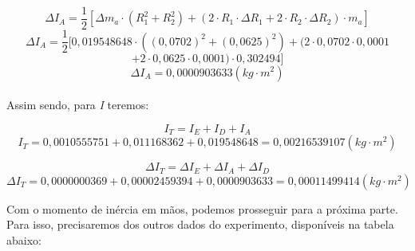 \[\Delta I_A = \frac{1}{2} 
    \left[ 
        \Delta m_a \cdot (R_1^2 + R_2^2) + 
        \left( 2 \cdot R_1 \cdot \Delta R_1 + 2 \cdot R_2 \cdot \Delta R_2 \right) \cdot m_a
    \right]
\]
\[\Delta I_A = \frac{1}{2} 
    [ 
        0,019548648 \cdot ((0,0702)^2 + (0,0625)^2) + 
        (2 \cdot 0,0702 \cdot 0,0001 
\]\[
        + 2 \cdot 0,0625 \cdot 0,0001) \cdot 0,302494
    ]
\]
\[\Delta I_A = 0,0000903633 (kg \cdot m^2)\]\\

Assim sendo, para \textit{I} teremos:

\[I_T = I_E + I_D + I_A\]
\[I_T = 0,0010555751 + 0,011168362 + 0,019548648 = 0,00216539107 (kg \cdot m^2)\]

\[\Delta I_T = \Delta I_E + \Delta I_A + \Delta I_D\]
\[\Delta I_T = 0,0000000369 + 0,00002459394 + 0,0000903633 = 0,00011499414 (kg \cdot m^2)\]

Com o momento de inércia em mãos, podemos prosseguir para a próxima parte. Para isso, precisaremos dos outros dados do experimento, disponíveis na tabela abaixo:

